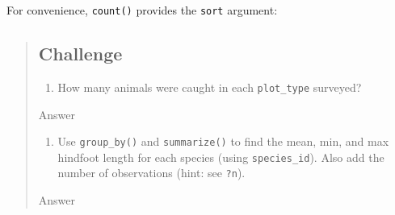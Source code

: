\documentclass[]{book}
\newenvironment{Shaded}{\begin{snugshade}}{\end{snugshade}}
\newcommand{\KeywordTok}[1]{\textcolor[rgb]{0.13,0.29,0.53}{\textbf{#1}}}
\newcommand{\DataTypeTok}[1]{\textcolor[rgb]{0.13,0.29,0.53}{#1}}
\newcommand{\StringTok}[1]{\textcolor[rgb]{0.31,0.60,0.02}{#1}}
\newcommand{\OtherTok}[1]{\textcolor[rgb]{0.56,0.35,0.01}{#1}}
\newcommand{\OperatorTok}[1]{\textcolor[rgb]{0.81,0.36,0.00}{\textbf{#1}}}
\newcommand{\NormalTok}[1]{#1}
\providecommand{\tightlist}{%
  \setlength{\itemsep}{0pt}\setlength{\parskip}{0pt}}
\begin{document}
For convenience, \texttt{count()} provides the \texttt{sort} argument:

\begin{Shaded}
\end{Shaded}

\begin{quote}
\subsection{Challenge}\label{challenge-6}

\begin{enumerate}
\def\labelenumi{\arabic{enumi}.}
\tightlist
\item
  How many animals were caught in each \texttt{plot\_type} surveyed?
\end{enumerate}

Answer

\begin{Shaded}
\end{Shaded}

\begin{enumerate}
\def\labelenumi{\arabic{enumi}.}
\setcounter{enumi}{1}
\tightlist
\item
  Use \texttt{group\_by()} and \texttt{summarize()} to find the mean,
  min, and max hindfoot length for each species (using
  \texttt{species\_id}). Also add the number of observations (hint: see
  \texttt{?n}).
\end{enumerate}

Answer

\begin{Shaded}
\end{Shaded}


\end{quote}
\end{document}
